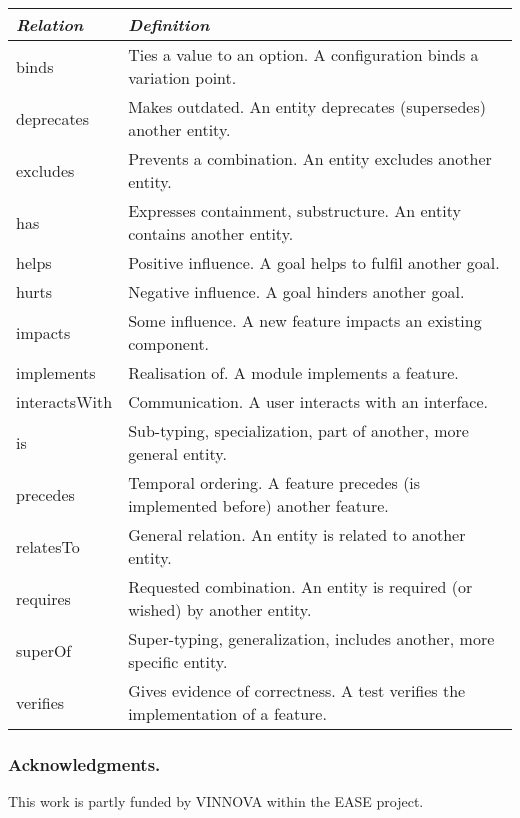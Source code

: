 \documentclass[a4paper]{llncs}
\begin{document}
\begin{minipage}{1\linewidth}
\begin{minipage}{0.47\textwidth}
\begin{table}[H]
\begin{tabular}{|l p{4.3cm}|}
\hline
\textit{Relation} & \textit{Definition}  \\ \hline
binds&Ties a value to an option. A configuration binds a variation point.\\
deprecates&Makes outdated. An entity deprecates (supersedes) another entity.\\
excludes&Prevents a combination. An entity excludes another entity.\\
has&Expresses containment, substructure. An entity contains another entity.\\
helps&Positive influence. A goal helps to fulfil another goal.\\
hurts&Negative influence. A goal hinders another goal.\\
impacts&Some influence. A new feature impacts an existing component.\\
implements&Realisation of. A module implements a feature.\\
interactsWith&Communication. A user interacts with an interface.\\
is&Sub-typing, specialization, part of another, more general entity.\\
precedes&Temporal ordering. A feature precedes (is implemented before) another feature.\\
relatesTo&General relation. An entity is related to another entity.\\
requires&Requested combination. An entity is required (or wished) by another entity.\\
superOf&Super-typing, generalization, includes another, more specific entity.\\
verifies&Gives evidence of correctness. A test verifies the implementation of a feature.\\
 \hline
\end{tabular}
\end{table}
\end{minipage}
\end{minipage}
\subsubsection*{Acknowledgments.} This work is partly funded by  VINNOVA within the EASE project.
\end{document}
